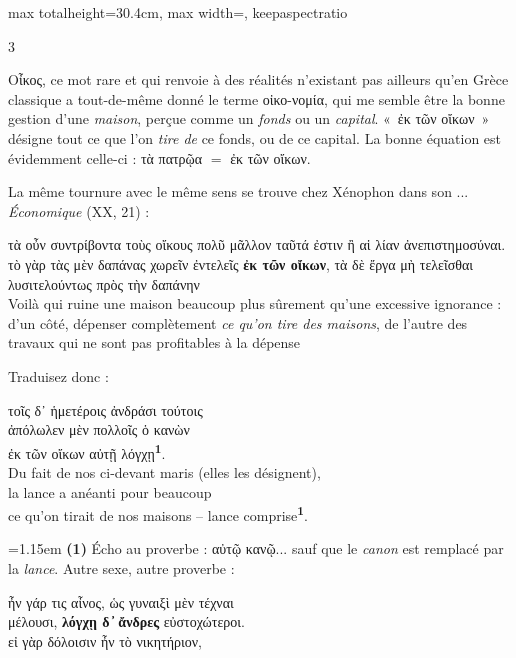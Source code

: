 \documentclass[11pt,twoside]{book}
\newcommand{\italique}[1]{\textit{#1}}
\newcommand{\citComm}[1]{\begin{quoting}[vskip=0.4pt,leftmargin=0.7em,rightmargin=0.2em]#1\end{quoting}}
\newcommand{\marqueur}[1]{\textsuperscript{\color{rubricRed}\textbf{#1}}}
\begin{document}
\begin{adjustbox}{max totalheight=30.4cm, max width=\textwidth, keepaspectratio}
\begin{minipage}{\textwidth}
{\begin{multicols}{3}
\par\vspace{1.5pt}
\noindent Οἶκος, ce mot rare et qui renvoie à des réalités n'existant pas ailleurs qu'en Grèce classique a tout-de-même donné le terme οἰκο-νομία, qui me semble être la bonne gestion d'une \italique{maison}, perçue comme un \italique{fonds} ou un \italique{capital}. «~ἐκ τῶν οἴκων~» désigne tout ce que l'on \italique{tire de} ce fonds, ou de ce capital. La bonne équation est évidemment celle-ci : τὰ πατρῷα $ = $ ἐκ τῶν οἴκων.
\par\vspace{1.5pt}
\noindent La même tournure avec le même sens se trouve chez Xénophon dans son ... \italique{Économique} (XX, 21) :
\citComm{τὰ οὖν συντρίβοντα τοὺς οἴκους πολῦ μᾶλλον ταῦτά ἐστιν ἢ αἱ λίαν ἀνεπιστημοσύναι. τὸ γὰρ τὰς μὲν δαπάνας χωρεῖν ἐντελεῖς \textbf{ἐκ τῶν οἴκων}, τὰ δὲ ἔργα μὴ τελεῖσθαι λυσιτελούντως πρὸς τὴν δαπάνην\\
Voilà qui ruine une maison beaucoup plus sûrement qu'une excessive ignorance : d'un côté, dépenser complètement \italique{ce qu'on tire des maisons}, de l'autre des travaux qui ne sont pas profitables à la dépense}
\par\vspace{1.5pt}
\noindent Traduisez donc :
\citComm{τοῖς δ᾽ ἡμετέροις ἀνδράσι τούτοις\\
ἀπόλωλεν μὲν πολλοῖς ὁ κανὼν\\
ἐκ τῶν οἴκων αὐτῇ λόγχῃ\marqueur{1}.\\
Du fait de nos ci-devant maris (elles les désignent),\\
la lance a anéanti pour beaucoup\\
ce qu'on tirait de nos maisons -- lance comprise\marqueur{1}.}
\par\vspace{1.5pt}
\par\vspace{1.2pt}\par\nopagebreak\vspace{1pt}\noindent\hangindent=1.15em {\color{sepiaNote}\textbf{(1)}} Écho au proverbe : αὐτῷ κανῷ... sauf que le \italique{canon} est remplacé par la \italique{lance}. Autre sexe, autre proverbe :
\citComm{ἦν γάρ τις αἶνος, ὡς γυναιξὶ μὲν τέχναι\\
μέλουσι, \textbf{λόγχῃ δ ̓ ἄνδρες} εὐστοχώτεροι.\\
εἰ γὰρ δόλοισιν ἦν τὸ νικητήριον,\\
}
\end{multicols}}
\end{minipage}
\end{adjustbox}
\end{document}
